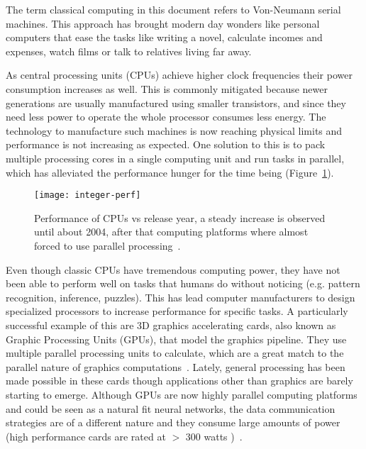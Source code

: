 The term classical computing in this document refers to Von-Neumann serial machines. This approach has brought modern day wonders like personal computers that ease the tasks like writing a novel, calculate incomes and expenses, watch films or talk to relatives living far away. 

As central processing units (CPUs) achieve higher clock frequencies their power consumption increases as well. This is commonly mitigated because newer generations are usually manufactured using smaller transistors, and since they need less power to operate the whole processor consumes less energy. The technology to manufacture such machines is now reaching physical limits and performance is not increasing as expected. One solution to this is to pack multiple processing cores in a single computing unit and run tasks in parallel, which has alleviated the performance hunger for the time being (Figure~\ref{fig:comp:moore}). 

\begin{figure}[h]
  \begin{center}
    \texttt{[image: integer-perf]}
    \caption{Performance of CPUs vs release year, a steady increase is observed until about 2004, after that computing platforms where almost forced to use parallel processing~\cite{int-perf-images}. }
    \label{fig:comp:moore}
  \end{center}
\end{figure}

Even though classic CPUs have tremendous computing power, they have not been able to perform well on tasks that humans do without noticing (e.g. pattern recognition, inference, puzzles). This has lead computer manufacturers to design specialized processors to increase performance for specific tasks. A particularly successful example of this are 3D graphics accelerating cards, also known as Graphic Processing Units (GPUs), that model the graphics pipeline. They use multiple parallel processing units to calculate, which are a great match to the parallel nature of graphics computations~\cite{nickolls2010gpu,chen2009gpu}. Lately, general processing has been made possible in these cards though applications other than graphics are barely starting to emerge. Although GPUs are now highly parallel computing platforms and could be seen as a natural fit neural networks, the data communication strategies are of a different nature and they consume large amounts of power (high performance cards are rated at $>$ 300 watts )~\cite{nvidia, amd}.


